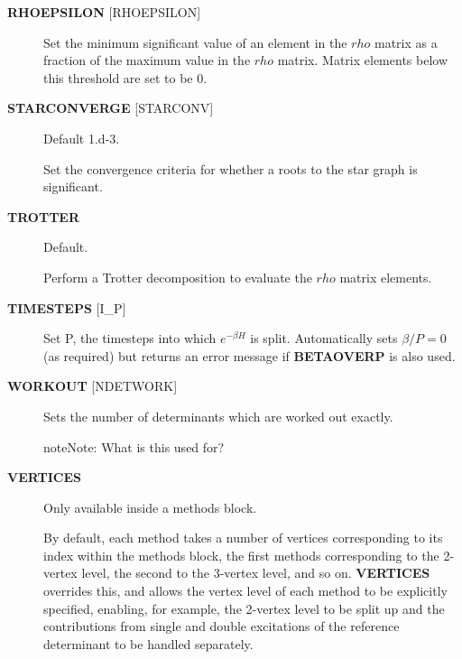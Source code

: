 \documentclass[openany,a4paper,10pt,english]{manual}
\begin{document}
\begin{description}
\begin{quote}
\begin{description}
\end{description}
\end{quote}

\item[\textbf{RHOEPSILON} {[}RHOEPSILON{]}] \leavevmode
Set the minimum significant value of an element in the $rho$
matrix as a fraction of the maximum value in the $rho$ matrix.
Matrix elements below this threshold are set to be 0.

\item[\textbf{STARCONVERGE} {[}STARCONV{]}] \leavevmode
Default 1.d-3.

Set the convergence criteria for whether a roots to the star graph
is significant.

\item[\textbf{TROTTER}] \leavevmode
Default.

Perform a Trotter decomposition to evaluate the $rho$ matrix elements.

\item[\textbf{TIMESTEPS} {[}I\_P{]}] \leavevmode
Set P, the timesteps into which $e^{-\beta H}$ is split.  Automatically
sets $\beta/P=0$ (as required) but returns an error message if \textbf{BETAOVERP}
is also used.

\item[\textbf{WORKOUT} {[}NDETWORK{]}] \leavevmode
Sets the number of determinants which are worked out exactly.

\begin{notice}{note}{Note:}
What is this used for?
\end{notice}

\item[\textbf{VERTICES}] \leavevmode
Only available inside a methods block.

By default, each method takes a
number of vertices corresponding to its index within the methods
block, the first methods corresponding to the 2-vertex level, the
second to the 3-vertex level, and so on.  \textbf{VERTICES} overrides this,
and allows the vertex level of each method to be explicitly specified,
enabling, for example, the 2-vertex level to be split up and the
contributions from single and double excitations of the reference
determinant to be handled separately.

\end{description}
\end{document}
